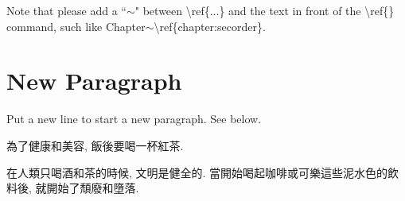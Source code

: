 Note that please add a ``$\sim$" between \textbackslash ref\{...\} and the text in front of the \textbackslash ref\{\} command, such like Chapter$\sim$\textbackslash ref\{chapter:secorder\}.



\section{New Paragraph}

Put a new line to start a new paragraph.
See below.

為了健康和美容, 飯後要喝一杯紅茶.

在人類只喝酒和茶的時候, 文明是健全的.
當開始喝起咖啡或可樂這些泥水色的飲料後, 就開始了頹廢和墮落.

